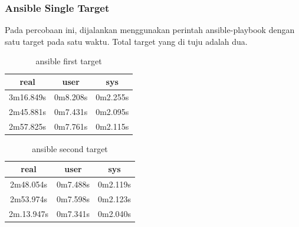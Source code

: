 \documentclass[10pt,]{report}
\begin{document}
\begin{adjustwidth}{20pt}{}
	\subsubsection{Ansible Single Target}
	\begin{adjustwidth}{20pt}{}
		Pada percobaan ini, dijalankan menggunakan perintah ansible-playbook dengan
		satu target pada satu waktu. Total target yang di tuju adalah dua.
		\begin{table}[H]
			\caption{ansible first target}
			\begin{center}
				\begin{tabular}[c]{|c|c|c|}
					\hline
					\multicolumn{1}{|c|}{\textbf{real}} &
					\multicolumn{1}{c|}{\textbf{user}}  &
					\multicolumn{1}{c|}{\textbf{sys}}                         \\
					\hline
					3m16.849s                           & 0m8.208s & 0m2.255s \\
					\hline
					2m45.881s                           & 0m7.431s & 0m2.095s \\
					\hline
					2m57.825s                           & 0m7.761s & 0m2.115s \\
					\hline
				\end{tabular}
			\end{center}
		\end{table}
		\begin{table}[H]
			\caption{ansible second target}
			\begin{center}
				\begin{tabular}[c]{|c|c|c|}
					\hline
					\multicolumn{1}{|c|}{\textbf{real}} &
					\multicolumn{1}{c|}{\textbf{user}}  &
					\multicolumn{1}{c|}{\textbf{sys}}                         \\
					\hline
					2m48.054s                           & 0m7.488s & 0m2.119s \\
					\hline
					2m53.974s                           & 0m7.598s & 0m2.123s \\
					\hline
					2m.13.947s                          & 0m7.341s & 0m2.040s \\
					\hline
				\end{tabular}
			\end{center}
		\end{table}
	\end{adjustwidth}

\end{adjustwidth}
\end{document}
